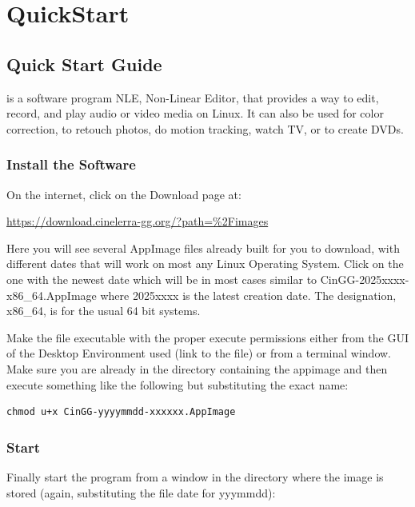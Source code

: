 \chapter{QuickStart}%
\label{cha:Quickstart}

\section{\CGG{} Quick Start Guide}%
\label{sec:cin_quick_start_guide}

\CGG{} is a software program NLE, Non-Linear Editor, that provides a way to edit, record, and play audio or video media on Linux.   It can also be used for color correction, to retouch photos, do motion tracking, watch TV, or to create DVDs.

\subsection{Install the Software}%
\label{sub:install_software}

On the internet, click on the Download page at:
\begin{center}
	{\small \url{https://download.cinelerra-gg.org/?path=\%2Fimages}}
\end{center}
Here you will see several AppImage files already built for you to download, with different dates that will work on most any Linux
Operating System. Click on the one with the newest date
which will be in most cases similar to CinGG-2025xxxx-x86\_64.AppImage where 2025xxxx is
the latest creation date. The designation, x86\_64, is for the usual 64 bit systems.

Make the file executable with the proper execute permissions either from the GUI of the Desktop Environment used (link to the file) or from a terminal window.  Make sure you are already in the directory containing the appimage and then execute something like the following but substituting the exact name:

\begin{lstlisting}[style=sh]
        chmod u+x CinGG-yyyymmdd-xxxxxx.AppImage
\end{lstlisting}


\subsection{Start \CGG{}}%
\label{sub:start_cinelerra_gg}

Finally start the program from a window in the directory where the image is stored (again, substituting the file date for yyymmdd):

